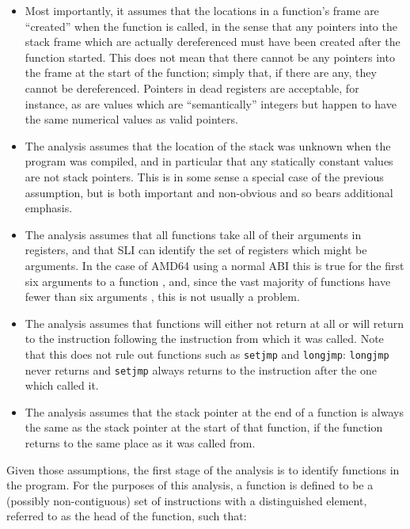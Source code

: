 \begin{itemize}
\item
  Most importantly, it assumes that the locations in a function's
  frame are ``created'' when the function is called, in the sense that
  any pointers into the stack frame which are actually dereferenced
  must have been created after the function started.  This does not
  mean that there cannot be any pointers into the frame at the start
  of the function; simply that, if there are any, they cannot be
  dereferenced.  Pointers in dead registers are acceptable, for
  instance, as are values which are ``semantically'' integers but
  happen to have the same numerical values as valid pointers.

\item
  The analysis assumes that the location of the stack was unknown when
  the program was compiled, and in particular that any statically
  constant values are not stack pointers.  This is in some sense a
  special case of the previous assumption, but is both important and
  non-obvious and so bears additional emphasis.

\item
  The analysis assumes that all functions take all of their arguments
  in registers, and that SLI can identify the set of registers which
  might be arguments.  In the case of AMD64 using a normal ABI this is
  true for the first six arguments to a function \needRef{}, and,
  since the vast majority of functions have fewer than six arguments
  \needRef{}, this is not usually a problem.

\item
  The analysis assumes that functions will either not return at all or
  will return to the instruction following the instruction from which
  it was called.  Note that this does not rule out functions such as
  \verb|setjmp| and \verb|longjmp|: \verb|longjmp| never returns and
  \verb|setjmp| always returns to the instruction after the one which
  called it.

\item
  The analysis assumes that the stack pointer at the end of a function
  is always the same as the stack pointer at the start of that
  function, if the function returns to the same place as it was called
  from.
\end{itemize}

Given those assumptions, the first stage of the analysis is to
identify functions in the program.  For the purposes of this analysis,
a function is defined to be a (possibly non-contiguous) set of
instructions with a distinguished element, referred to as the head of
the function, such that:

